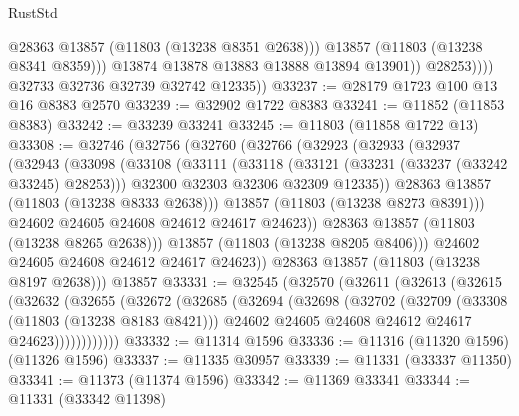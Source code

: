 \begin{lexlean}{RustStd}
\begin{coremodule}
                        @28363
                        @13857
                        (@11803 (@13238 @8351 @2638)))
                      @13857
                      (@11803 (@13238 @8341 @8359)))
                    @13874
                    @13878
                    @13883
                    @13888
                    @13894
                    @13901))
                @28253))))
        @32733
        @32736
        @32739
        @32742
        @12335))
@33237 := @28179 @1723 @100 @13 @16 @8383 @2570
@33239 := @32902 @1722 @8383
@33241 := @11852 (@11853 @8383)
@33242 := @33239 @33241
@33245 := @11803 (@11858 @1722 @13)
@33308 := @32746
    (@32756
      (@32760
        (@32766
          (@32923
            (@32933
              (@32937
                (@32943
                  (@33098
                    (@33108
                      (@33111
                        (@33118
                          (@33121 (@33231 (@33237 (@33242 @33245) @28253)))
                          @32300
                          @32303
                          @32306
                          @32309
                          @12335))
                      @28363
                      @13857
                      (@11803 (@13238 @8333 @2638)))
                    @13857
                    (@11803 (@13238 @8273 @8391)))
                  @24602
                  @24605
                  @24608
                  @24612
                  @24617
                  @24623))
              @28363
              @13857
              (@11803 (@13238 @8265 @2638)))
            @13857
            (@11803 (@13238 @8205 @8406)))
          @24602
          @24605
          @24608
          @24612
          @24617
          @24623))
      @28363
      @13857
      (@11803 (@13238 @8197 @2638)))
    @13857
@33331 := @32545
    (@32570
      (@32611
        (@32613
          (@32615
            (@32632
              (@32655
                (@32672
                  (@32685
                    (@32694
                      (@32698
                        (@32702
                          (@32709
                            (@33308 (@11803 (@13238 @8183 @8421)))
                            @24602
                            @24605
                            @24608
                            @24612
                            @24617
                            @24623))))))))))))
@33332 := @11314 @1596
@33336 := @11316 (@11320 @1596) (@11326 @1596)
@33337 := @11335 @30957
@33339 := @11331 (@33337 @11350)
@33341 := @11373 (@11374 @1596)
@33342 := @11369 @33341
@33344 := @11331 (@33342 @11398)

\end{coremodule}
\end{lexlean}
